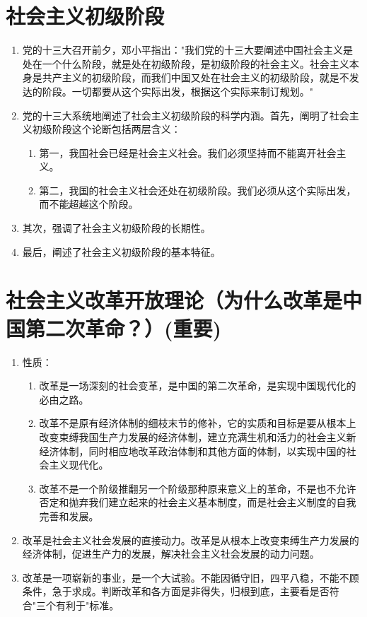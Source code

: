 \documentclass[12pt, a4paper, oneside]{ctexbook}
\begin{document}
\section{社会主义初级阶段}

\begin{enumerate}[label=（\arabic*）]
\item 党的十三大召开前夕，邓小平指出："我们党的十三大要阐述中国社会主义是处在一个什么阶段，就是处在初级阶段，是初级阶段的社会主义。社会主义本身是共产主义的初级阶段，而我们中国又处在社会主义的初级阶段，就是不发达的阶段。一切都要从这个实际出发，根据这个实际来制订规划。"

\item 党的十三大系统地阐述了社会主义初级阶段的科学内涵。首先，阐明了社会主义初级阶段这个论断包括两层含义：

\begin{enumerate}[label=（\roman*）]
\item 第一，我国社会已经是社会主义社会。我们必须坚持而不能离开社会主义。

\item 第二，我国的社会主义社会还处在初级阶段。我们必须从这个实际出发，而不能超越这个阶段。
\end{enumerate}

\item 其次，强调了社会主义初级阶段的长期性。

\item 最后，阐述了社会主义初级阶段的基本特征。
\end{enumerate}

\section{社会主义改革开放理论（为什么改革是中国第二次革命？）(重要)}

\begin{enumerate}[label=（\arabic*）]
\item 性质：
\begin{enumerate}[label=（\roman*）]
\item 改革是一场深刻的社会变革，是中国的第二次革命，是实现中国现代化的必由之路。

\item 改革不是原有经济体制的细枝末节的修补，它的实质和目标是要从根本上改变束缚我国生产力发展的经济体制，建立充满生机和活力的社会主义新经济体制，同时相应地改革政治体制和其他方面的体制，以实现中国的社会主义现代化。

\item 改革不是一个阶级推翻另一个阶级那种原来意义上的革命，不是也不允许否定和抛弃我们建立起来的社会主义基本制度，而是社会主义制度的自我完善和发展。
\end{enumerate}

\item 改革是社会主义社会发展的直接动力。改革是从根本上改变束缚生产力发展的经济体制，促进生产力的发展，解决社会主义社会发展的动力问题。

\item 改革是一项崭新的事业，是一个大试验。不能因循守旧，四平八稳，不能不顾条件，急于求成。判断改革和各方面是非得失，归根到底，主要看是否符合"三个有利于"标准。
\end{enumerate}
\end{document}
